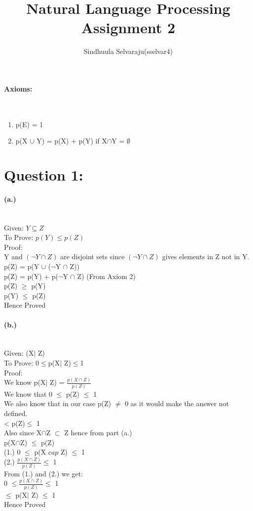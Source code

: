 \documentclass{article}
\title{Natural Language Processing Assignment 2}
\author{Sindhuula Selvaraju(sselvar4)}
\begin{document}
\maketitle
\paragraph{Axioms:}
\\
\begin{enumerate}
    \item p(E) = 1
    \item p(X $\cup$ Y) = p(X) + p(Y) if X$\cap$Y = $\emptyset$
\end{enumerate}
\section{Question 1:}
{
\paragraph{(a.)}
\\Given: $Y\subseteq Z$ 
\\To Prove: $p(Y) \leq p(Z)$
\\Proof:
\\Y and $(\neg Y \cap Z)$ are disjoint sets since $(\neg Y \cap Z)$ gives elements in Z not in Y. 
\\ p(Z) = p(Y $\cup$ ($\neg$Y $\cap$ Z))
\\ p(Z) = p(Y) + p($\neg$Y $\cap$ Z) (From Axiom 2)
\\ p(Z) $\geq$ p(Y)
\\ \Rightarrow p(Y) $\leq$ p(Z)
\\Hence Proved
\\
\paragraph{(b.)}
\\Given: (X$\mid$ Z)
\\To Prove: 0$\leq$p(X$\mid$ Z)$\leq$1
\\Proof:
\\We know p(X$\mid$ Z) = $\frac{p(X\cap Z)}{p(Z)}$
\\We know that 0 $\leq$ p(Z) $\leq$ 1
\\We also know that in our case p(Z) $\neq$ 0 as it would make the answer not defined.
\\ < p(Z)$\leq$ 1
\\Also since X$\cap$Z $\subset$ Z hence from part (a.)
\\p(X$\cap$Z) $\leq$ p(Z)
\\\Rightarrow (1.) 0 $\leq$ p(X $cap$ Z) $\leq$ 1
\\ \Rightarrow(2.) $\frac{p(X\cap Z)}{p(Z)} \leq$ 1
\\ From (1.) and (2.) we get:
\\ 0 $\leq \frac{p(X\cap Z)}{p(Z)} \leq$ 1
\\ $\leq$ p(X$\mid$ Z) $\leq$ 1 
\\Hence Proved
\\
}
\end{document}
